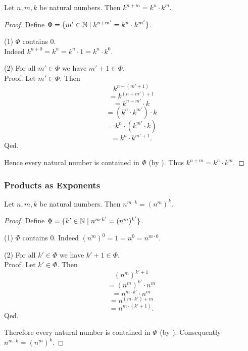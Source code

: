 \documentclass[10pt]{article}
\begin{document}
  \begin{forthel}
    \begin{proposition}
      Let $n, m, k$ be natural numbers.
      Then $k^{n + m} = k^{n} \cdot k^{m}$.
    \end{proposition}
    \begin{proof}
      Define $\Phi = \{ m' \in \mathbb{N} \mid k^{n + m'} = k^{n} \cdot k^{m'} \}$.

      (1) $\Phi$ contains $0$. \\
      Indeed $k^{n + 0}
        = k^{n}
        = k^{n} \cdot 1
        = k^{n} \cdot k^{0}$.

      (2) For all $m' \in \Phi$ we have $m' + 1 \in \Phi$. \\
      Proof.
        Let $m' \in \Phi$.
        Then
        \[  k^{n + (m' + 1)}                  \]
        \[    = k^{(n + m') + 1}              \]
        \[    = k^{n + m'} \cdot k            \]
        \[    = (k^{n} \cdot k^{m'}) \cdot k  \]
        \[    = k^{n} \cdot (k^{m'} \cdot k)  \]
        \[    = k^{n} \cdot k^{m' + 1}.       \]
      Qed.

      Hence every natural number is contained in $\Phi$ (by ).
      Thus $k^{n + m} = k^{n} \cdot k^{m}$.
    \end{proof}
  \end{forthel}


  \subsubsection*{Products as Exponents}

  \begin{forthel}
    \begin{proposition}
      Let $n, m, k$ be natural numbers.
      Then $n^{m \cdot k} = (n^{m})^{k}$.
    \end{proposition}
    \begin{proof}
      Define $\Phi = \{ k' \in \mathbb{N} \mid n^{m \cdot k'} = (n^{m})^{k'} \}$.

      (1) $\Phi$ contains $0$.
      Indeed $(n^{m})^{0}
        = 1
        = n^{0}
        = n^{m \cdot 0}$.

      (2) For all $k' \in \Phi$ we have $k' + 1 \in \Phi$. \\
      Proof.
        Let $k' \in \Phi$.
        Then
        \[  (n^{m})^{k' + 1}                \]
        \[    = (n^{m})^{k'} \cdot n^{m}    \]
        \[    = n^{m \cdot k'} \cdot n^{m}  \]
        \[    = n^{(m \cdot k') + m}        \]
        \[    = n^{m \cdot (k' + 1)}.       \]
      Qed.

      Therefore every natural number is contained in $\Phi$ (by ).
      Consequently $n^{m \cdot k} = (n^{m})^{k}$.
    \end{proof}
  \end{forthel}
\end{document}
